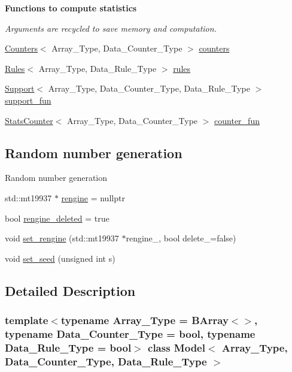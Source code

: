 \begin{Indent}\textbf{ Functions to compute statistics}\par
{\em Arguments are recycled to save memory and computation. }\begin{DoxyCompactItemize}
\item 
\hyperlink{class_counters}{Counters}$<$ Array\+\_\+\+Type, Data\+\_\+\+Counter\+\_\+\+Type $>$ \hyperlink{class_model_a3189eb46eed19f865ca0aa3f6b191c78}{counters}
\item 
\hyperlink{class_rules}{Rules}$<$ Array\+\_\+\+Type, Data\+\_\+\+Rule\+\_\+\+Type $>$ \hyperlink{class_model_a65b96a73f8dba8a00cc767753aaca22b}{rules}
\item 
\hyperlink{class_support}{Support}$<$ Array\+\_\+\+Type, Data\+\_\+\+Counter\+\_\+\+Type, Data\+\_\+\+Rule\+\_\+\+Type $>$ \hyperlink{class_model_aa9806f4bf7d9c935f37a31e67bbfbee4}{support\+\_\+fun}
\item 
\hyperlink{class_stats_counter}{Stats\+Counter}$<$ Array\+\_\+\+Type, Data\+\_\+\+Counter\+\_\+\+Type $>$ \hyperlink{class_model_a2bb5ec8af1a49bcb2da6c5f9f2374b15}{counter\+\_\+fun}
\end{DoxyCompactItemize}
\end{Indent}
\subsection*{Random number generation}
\label{_amgrp9e5d9cca94c03e04e66d088f8628d19b}%
Random number generation \begin{DoxyCompactItemize}
\item 
std\+::mt19937 $\ast$ \hyperlink{class_model_a0f890665302d545663698000cd13a73f}{rengine} = nullptr
\item 
bool \hyperlink{class_model_ab541ac2a0bbac640e2b8cdd745f1a632}{rengine\+\_\+deleted} = true
\item 
void \hyperlink{class_model_a1609f530936b0f575e8b0006c9c719c5}{set\+\_\+rengine} (std\+::mt19937 $\ast$rengine\+\_\+, bool delete\+\_\+=false)
\item 
void \hyperlink{class_model_a5baf09853382529460889f15076bc64a}{set\+\_\+seed} (unsigned int s)
\end{DoxyCompactItemize}


\subsection{Detailed Description}
\subsubsection*{template$<$typename Array\+\_\+\+Type = B\+Array$<$$>$, typename Data\+\_\+\+Counter\+\_\+\+Type = bool, typename Data\+\_\+\+Rule\+\_\+\+Type = bool$>$\newline
class Model$<$ Array\+\_\+\+Type, Data\+\_\+\+Counter\+\_\+\+Type, Data\+\_\+\+Rule\+\_\+\+Type $>$}

